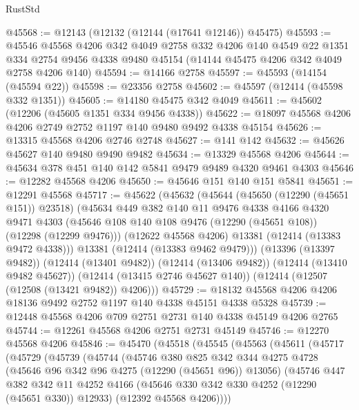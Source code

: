 \begin{lexlean}{RustStd}
\begin{coremodule}
@45568 := @12143 (@12132 (@12144 (@17641 @12146)) @45475)
@45593 := @45546
    @45568
    @4206
    @342
    @4049
    @2758
    @332
    @4206
    @140
    @4549
    @22
    @1351
    @334
    @2754
    @9456
    @4338
    @9480
    @45154
    (@14144 @45475 @4206 @342 @4049 @2758 @4206 @140)
@45594 := @14166 @2758
@45597 := @45593 (@14154 (@45594 @22))
@45598 := @23356 @2758
@45602 := @45597 (@12414 (@45598 @332 @1351))
@45605 := @14180 @45475 @342 @4049
@45611 := @45602 (@12206 (@45605 @1351 @334 @9456 @4338))
@45622 := @18097 @45568 @4206 @4206 @2749 @2752 @1197 @140 @9480 @9492 @4338 @45154
@45626 := @13315 @45568 @4206 @2746 @2748
@45627 := @141 @142
@45632 := @45626 @45627 @140 @9480 @9490 @9482
@45634 := @13329 @45568 @4206
@45644 := @45634 @378 @451 @140 @142 @5841 @9479 @9489 @4320 @9461 @4303
@45646 := @12282 @45568 @4206
@45650 := @45646 @151 @140 @151 @5841
@45651 := @12291 @45568
@45717 := @45622
    (@45632
      (@45644
        (@45650 (@12290 (@45651 @151)) @23518)
        (@45634
          @449
          @382
          @140
          @11
          @9476
          @4338
          @4166
          @4320
          @9471
          @4303
          (@45646 @108 @140 @108 @9476 (@12290 (@45651 @108)) (@12298 (@12299 @9476)))
          (@12622 @45568 @4206)
          @13381
          (@12414 (@13383 @9472 @4338)))
        @13381
        (@12414 (@13383 @9462 @9479)))
      (@13396 (@13397 @9482))
      (@12414 (@13401 @9482))
      (@12414 (@13406 @9482))
      (@12414 (@13410 @9482 @45627))
      (@12414 (@13415 @2746 @45627 @140))
      (@12414 (@12507 (@12508 (@13421 @9482)) @4206)))
@45729 := @18132 @45568 @4206 @4206 @18136 @9492 @2752 @1197 @140 @4338 @45151 @4338 @5328
@45739 := @12448 @45568 @4206 @709 @2751 @2731 @140 @4338 @45149 @4206 @2765
@45744 := @12261 @45568 @4206 @2751 @2731 @45149
@45746 := @12270 @45568 @4206
@45846 := @45470
    (@45518
      (@45545
        (@45563
          (@45611
            (@45717
              (@45729
                (@45739
                  (@45744
                    (@45746
                      @380
                      @825
                      @342
                      @344
                      @4275
                      @4728
                      (@45646 @96 @342 @96 @4275 (@12290 (@45651 @96)) @13056)
                      (@45746
                        @447
                        @382
                        @342
                        @11
                        @4252
                        @4166
                        (@45646 @330 @342 @330 @4252 (@12290 (@45651 @330)) @12933)
                        (@12392 @45568 @4206))))

\end{coremodule}
\end{lexlean}
